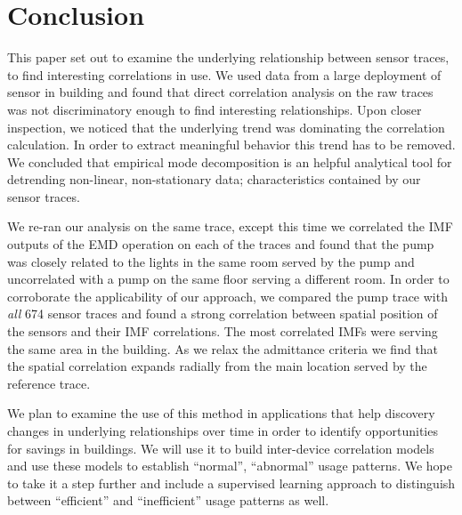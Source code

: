 



\section{Conclusion}





This paper set out to examine the underlying relationship between sensor traces, to find interesting correlations
in use.  We used data from a large deployment of sensor in building and found that direct correlation analysis on the raw
traces was not discriminatory enough to find interesting relationships.  Upon closer inspection, we noticed that
the underlying trend was dominating the correlation calculation.  In order to extract meaningful behavior this trend has
to be removed.  We concluded that empirical mode decomposition is an helpful analytical tool for detrending 
non-linear, non-stationary data; characteristics contained by our sensor traces.

We re-ran our analysis on the same trace, except this time we correlated the IMF outputs of the EMD operation on each of the traces and found that the pump was closely related to the lights in the same room served by the pump and
uncorrelated with a pump on the same floor serving a different room.  In order to corroborate the applicability
of our approach, we compared the pump trace with \emph{all} 674 sensor traces and found a strong correlation
between spatial position of the sensors and their IMF correlations.  The most correlated IMFs were serving the same
area in the building.  As we relax the admittance criteria we find that the spatial correlation expands radially from
the main location served by the reference trace.

We plan to examine the use of this method in applications that help discovery changes in underlying relationships over time
in order to identify opportunities for savings in buildings.  We will use it to build inter-device correlation models
and use these models to establish ``normal'', ``abnormal'' usage patterns.  We hope to take it a step further and include a
supervised learning approach to distinguish between ``efficient'' and ``inefficient'' usage patterns as well.






